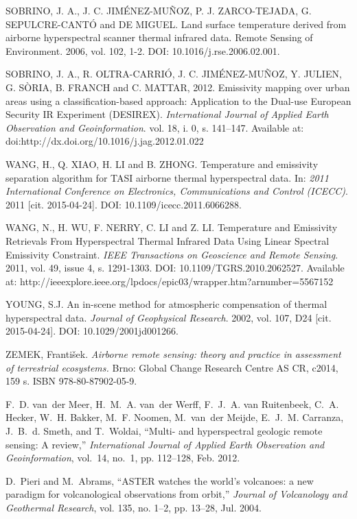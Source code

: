 \begin{thebibliography}{10}
 SOBRINO, J. A., J. C. JIMÉNEZ-MUÑOZ, P. J. ZARCO-TEJADA, G. SEPULCRE-CANTÓ and DE MIGUEL. Land surface temperature derived from airborne hyperspectral scanner thermal infrared data. Remote Sensing of Environment. 2006, vol. 102, 1-2. DOI: 10.1016/j.rse.2006.02.001.

 SOBRINO, J. A., R. OLTRA-CARRIÓ, J. C. JIMÉNEZ-MUÑOZ, Y. JULIEN, G. SÒRIA, B. FRANCH and C. MATTAR, 2012. Emissivity mapping over urban areas using a classification-based approach: Application to the Dual-use European Security IR Experiment (DESIREX). \textit{International Journal of Applied Earth Observation and Geoinformation}. vol. 18, i. 0, s. 141–147. Available at: doi:http://dx.doi.org/10.1016/j.jag.2012.01.022

 WANG, H., Q. XIAO, H. LI and B. ZHONG. Temperature and emissivity separation algorithm for TASI airborne thermal hyperspectral data. In: \textit{2011 International Conference on Electronics, Communications and Control (ICECC)}. 2011 [cit. 2015-04-24]. DOI: 10.1109/icecc.2011.6066288.

 WANG, N., H. WU, F. NERRY, C. LI and Z. LI. Temperature and Emissivity Retrievals From Hyperspectral Thermal Infrared Data Using Linear Spectral Emissivity Constraint. \textit{IEEE Transactions on Geoscience and Remote Sensing}. 2011, vol. 49, issue 4, s. 1291-1303. DOI: 10.1109/TGRS.2010.2062527. Available at: http://ieeexplore.ieee.org/lpdocs/epic03/wrapper.htm?arnumber=5567152

 YOUNG, S.J. An in-scene method for atmospheric compensation of thermal hyperspectral data. \textit{Journal of Geophysical Research}. 2002, vol. 107, D24 [cit. 2015-04-24]. DOI: 10.1029/2001jd001266.

 ZEMEK, František. \textit{Airborne remote sensing: theory and practice in assessment of terrestrial ecosystems.} Brno: Global Change Research Centre AS CR, c2014, 159 s. ISBN 978-80-87902-05-9.

F.~D. van~der Meer, H.~M.~A. van~der Werff, F.~J.~A. van Ruitenbeek, C.~A.
  Hecker, W.~H. Bakker, M.~F. Noomen, M.~van~der Meijde, E.~J.~M. Carranza,
  J.~B.~d. Smeth, and T.~Woldai, ``Multi- and hyperspectral geologic remote
  sensing: {A} review,'' \emph{International Journal of Applied Earth
  Observation and Geoinformation}, vol.~14, no.~1, pp. 112--128, Feb. 2012.

D.~Pieri and M.~Abrams, ``{ASTER} watches the world's volcanoes: a new paradigm
  for volcanological observations from orbit,'' \emph{Journal of Volcanology
  and Geothermal Research}, vol. 135, no. 1–2, pp. 13--28, Jul. 2004.


\end{thebibliography}

